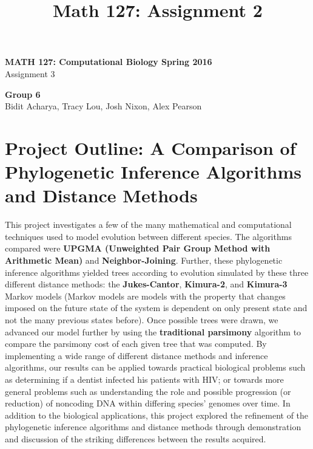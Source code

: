\documentclass[11pt]{article}
\title{Math 127: Assignment 2}
\theoremstyle{definition}\newtheorem*{problem}{Problem}
\theoremstyle{remark}\newtheorem{claim}{Claim}
\theoremstyle{remark}\newtheorem*{sol}{Solution}
\begin{document}
\begin{center} {\Large \bf MATH 127: Computational Biology Spring 2016 } \\
                [8pt]{Assignment 3\\ [8pt]}\end{center}
                
                \begin{center} \textbf{Group 6}\\ Bidit Acharya, Tracy Lou, Josh Nixon, Alex Pearson
                \end{center}
                
\section{Project Outline: A Comparison of Phylogenetic Inference Algorithms and Distance Methods}

\par This project investigates a few of the many mathematical and computational techniques used to model evolution between different species. The algorithms compared were \textbf{UPGMA (Unweighted Pair Group Method with Arithmetic Mean)} and \textbf{Neighbor-Joining}. Further, these phylogenetic inference algorithms yielded trees according to evolution simulated by these three different distance methods: the \textbf{Jukes-Cantor}, \textbf{Kimura-2}, and \textbf{Kimura-3} Markov models (Markov models are models  with the property that changes imposed on the future state of the system is dependent on only present state and not the many previous states before). Once possible trees were drawn, we advanced our model further by using the \textbf{traditional parsimony} algorithm to compare the parsimony cost of each given tree that was computed. By implementing a wide range of different distance methods and inference algorithms, our results can be applied towards practical biological problems such as determining if a dentist infected his patients with HIV; or towards more general problems such as understanding the role and possible progression (or reduction) of noncoding DNA within differing species' genomes over time. In addition to the biological applications, this project explored the refinement of the phylogenetic inference algorithms and distance methods through demonstration and discussion of the striking differences between the results acquired.
\end{document}
